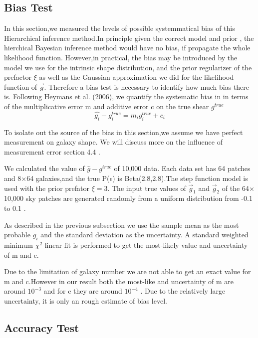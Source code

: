 \documentclass[useAMS,usenatbib]{mn2e}
\begin{document}
\subsection{Bias Test}
In this section,we measured the levels of possible systemmatical
bias of this Hierarchical inference method.In principle given the correct model and prior ,
the hierchical Bayesian inference method would have no bias, if propagate the whole likelihood function.
However,in practical, the bias may be introduced by the model we use for the intrinsic shape distribution,
and the prior regularizer of the prefactor $\xi$ as well as the Gaussian approximation we did for the likelihood
function of $\vec{g}$. Therefore a bias test is necessary to identify how much bias there is. 
Following Heymans et al. (2006), we quantify the systematic bias in
in terms of the multiplicative error m and additive error c on the
true shear $g^{true}$ 
\begin{equation}
\hat{g_{i}}-g_{i}^{true}=m_{i}g_{i}^{true}+c_{i}
\end{equation}

To isolate out the source of the bias in this section,we assume we have perfect measurement on galaxy shape.
We will discuss more on the influence of measurement error section 4.4 .

We calculated the value of $\hat{g}-g^{true}$ of 10,000 data. Each data set has 64 patches and 8$\times$64 galaxies,and
the true P($\epsilon$) is Beta(2.8,2.8).The step function model is used with the prior prefator $\xi=3$.
The input true values of $\vec{g}_{1}$ and $\vec{g}_{2}$ of the 64$\times$10,000 sky patches are generated randomly from a uniform distribution from -0.1 to 0.1 . 

As described in the previous subsection we use the sample mean as the most probable $g_{i}$ and 
the standard deviation as the uncertainty. A standard weighted minimum $\chi^{2}$ linear fit is performed to get the
most-likely value and uncertainty of m and c.
 
Due to the limitation of galaxy number we are not able to get an exact value for m and c.However in our result 
both the most-like and uncertainty of m are around $10^{-3}$ and for c they are around $10^{-4}$ . Due to the
relatively large uncertainty, it is only an rough estimate of bias level.

\subsection{Accuracy Test}
\end{document}
